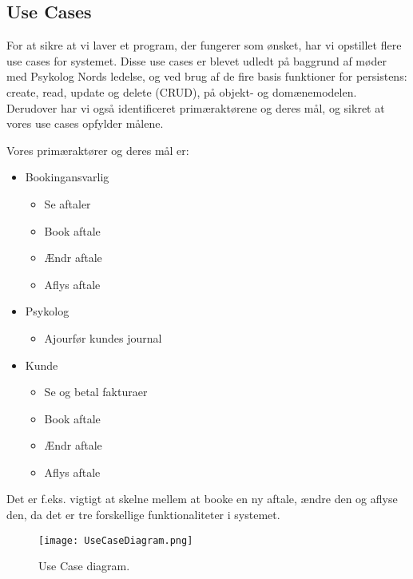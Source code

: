 \subsection{Use Cases}
\label{UseCases}
For at sikre at vi laver et program, der fungerer som ønsket, har vi opstillet flere use cases for systemet.
Disse use cases er blevet udledt på baggrund af møder med Psykolog Nords ledelse, og ved brug af de fire basis funktioner for persistens: create, read, update og delete (CRUD), på objekt- og domænemodelen.
Derudover har vi også identificeret primæraktørene og deres mål, og sikret at vores use cases opfylder målene.

Vores primæraktører og deres mål er:

\begin{itemize}
    \item Bookingansvarlig
        \begin{itemize}
            \item Se aftaler
            \item Book aftale
            \item Ændr aftale
            \item Aflys aftale
        \end{itemize}
    \item Psykolog
        \begin{itemize}
            \item Ajourfør kundes journal
        \end{itemize}
    \item Kunde
        \begin{itemize}
            \item Se og betal fakturaer
            \item Book aftale
            \item Ændr aftale
            \item Aflys aftale
        \end{itemize}

\end{itemize}

Det er f.eks. vigtigt at skelne mellem at booke en ny aftale, ændre den og aflyse den, da det er tre forskellige funktionaliteter i systemet.

\begin{figure}[h]
	\centering
  		\texttt{[image: UseCaseDiagram.png]}
  \caption{Use Case diagram.}
  \label{fig:UseCaseDiagram}
\end{figure}

